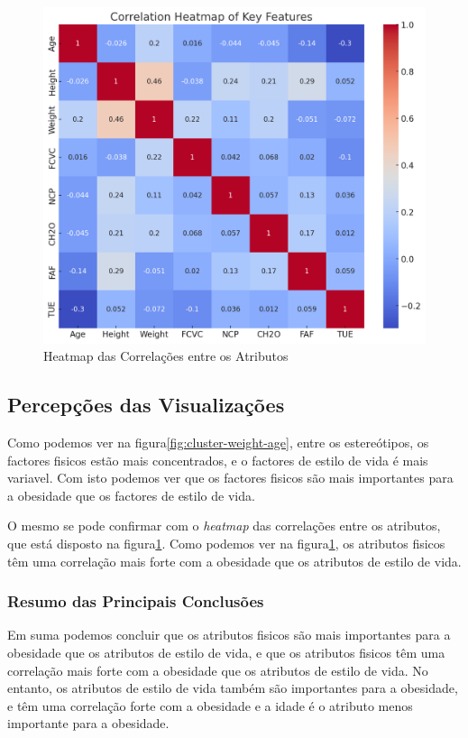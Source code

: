 \documentclass{easychair}
\begin{document}
\begin{figure}[hbt!]
  \centering
  \begin{minipage}
    {\linewidth}
    \includegraphics[width=0.9\linewidth]{images/heatmap.jpg}
  \end{minipage}
  \caption{Heatmap das Correlações entre os Atributos}
  \label{fig:correlation-heatmap}
\end{figure}

\subsection{Percepções das Visualizações}

Como podemos ver na figura\ref{fig:cluster-weight-age}, entre os estereótipos, os factores fisicos estão mais concentrados, e o factores de estilo de vida é mais variavel. Com isto podemos ver que os factores fisicos são mais importantes para a obesidade que os factores de estilo de vida.

O mesmo se pode confirmar com o \textit{heatmap} das correlações entre os atributos, que está disposto na figura\ref{fig:correlation-heatmap}. Como podemos ver na figura\ref{fig:correlation-heatmap}, os atributos fisicos têm uma correlação mais forte com a obesidade que os atributos de estilo de vida.

\subsubsection{Resumo das Principais Conclusões}

Em suma podemos concluir que os atributos fisicos são mais importantes para a obesidade que os atributos de estilo de vida, e que os atributos fisicos têm uma correlação mais forte com a obesidade que os atributos de estilo de vida. No entanto, os atributos de estilo de vida também são importantes para a obesidade, e têm uma correlação forte com a obesidade e a idade é o atributo menos importante para a obesidade.
\end{document}
